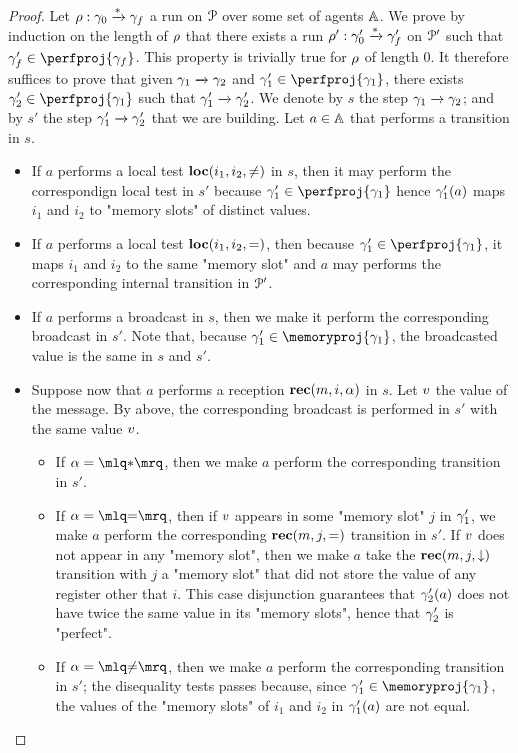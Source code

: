 \begin{proof}
	Let $\rho: \gamma_0 \xrightarrow{*} \gamma_f$ a run on $\mathcal{P}$ over some set of agents $\mathbb{A}$. We prove by induction on the length of $\rho$ that there exists a run $\rho': \gamma_0' \xrightarrow{*} \gamma_f'$ on $\mathcal{P}'$ such that $\config_f' \in \perfproj{\config_f}$. This property is trivially true for $\rho$ of length $0$. It therefore suffices to prove that given $\gamma_1 \xrightarrow{} \gamma_2$ and $\config_1' \in \perfproj{\config_1}$, there exists $\config_2' \in \perfproj{\config_1}$ such that $\gamma_1' \xrightarrow{} \gamma_2'$. We denote by $s$ the step $\gamma_1 \xrightarrow{} \gamma_2$; and by $s'$ the step $\gamma'_1 \xrightarrow{} \gamma'_2$ that we are building. 
	Let $a \in \mathbb{A}$ that performs a transition in $s$.
	\begin{itemize}
	\item If $a$ performs a local test $\textbf{loc}(i_1,i_2,{\ne})$ in $s$, then it may perform the correspondign local test in $s'$ because $\config_1' \in \perfproj{\config_1}$ hence $\gamma_1'(a)$ maps $i_1$ and $i_2$ to "memory slots" of distinct values. 
	\item If $a$ performs a local test  $\textbf{loc}(i_1,i_2,{=})$, then because $\config_1'\in \perfproj{\config_1}$, it maps $i_1$ and $i_2$ to the same "memory slot" and $a$ may performs the corresponding internal transition in $\mathcal{P}'$.  
	\item If $a$ performs a broadcast in $s$, then we make it perform the corresponding broadcast in $s'$. Note that, because $\config_1' \in \memoryproj{\config_1}$, the broadcasted value is the same in $s$ and $s'$. 
	\item 
	Suppose now that $a$ performs a reception $\textbf{rec}(m, i, \alpha)$ in $s$. Let $v$ the value of the message. By above, the corresponding broadcast is performed in $s'$ with the same value $v$. 
		\begin{itemize}
		\item If $\anact = \quotemarks{\dummyact}$, then we make $a$ perform the corresponding transition in $s'$. 
		\item If $\anact = \quotemarks{\eqtestact}$, then if $v$ appears in some "memory slot" $j$ in $\gamma_1'$, we make $a$ perform the corresponding $\textbf{rec}(m, j, {=})$ transition in $s'$. 
		If $v$ does not appear in any "memory slot", then we make $a$ take the $\textbf{rec}(m, j, \downarrow)$ transition with $j$ a "memory slot" that did not store the value of any register other that $i$. This case disjunction guarantees that $\gamma_2'(a)$ does not have twice the same value in its "memory slots", hence that $\gamma_2'$ is "perfect".
		\item If $\anact = \quotemarks{\diseqtestact}$, then we make $a$ perform the corresponding transition in $s'$; the disequality tests passes because, since $\config_1' \in \memoryproj{\config_1}$, the values of the "memory slots" of $i_1$ and $i_2$ in $\gamma_1'(a)$ are not equal.
		\end{itemize}
	\end{itemize}


\end{proof}
